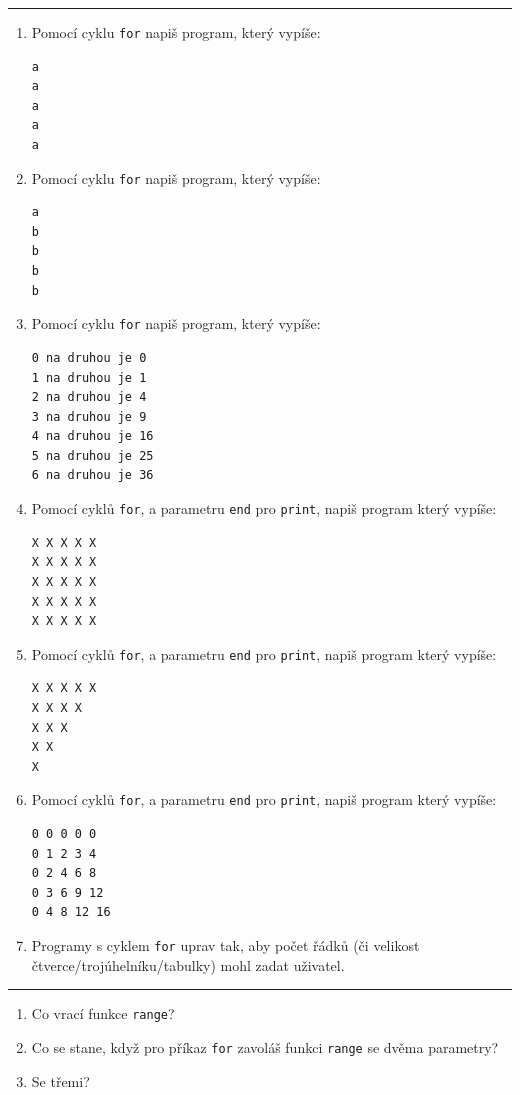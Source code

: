 \documentclass[a4paper,10pt]{article}
\begin{document}
\hrule

\begin{enumerate}[resume]
\item Pomocí cyklu \verb+for+ napiš program, který vypíše:
\begin{verbatim}
a
a
a
a
a
\end{verbatim}

\item Pomocí cyklu \verb+for+ napiš program, který vypíše:
\begin{verbatim}
a
b
b
b
b
\end{verbatim}

\item Pomocí cyklu \verb+for+ napiš program, který vypíše:
\begin{verbatim}
0 na druhou je 0
1 na druhou je 1
2 na druhou je 4
3 na druhou je 9
4 na druhou je 16
5 na druhou je 25
6 na druhou je 36
\end{verbatim}

\item Pomocí cyklů \verb+for+, a parametru \verb+end+ pro \verb+print+, napiš program který vypíše:
\begin{verbatim}
X X X X X
X X X X X
X X X X X
X X X X X
X X X X X
\end{verbatim}

\item Pomocí cyklů \verb+for+, a parametru \verb+end+ pro \verb+print+, napiš program který vypíše:
\begin{verbatim}
X X X X X
X X X X
X X X
X X
X
\end{verbatim}

\item Pomocí cyklů \verb+for+, a parametru \verb+end+ pro \verb+print+, napiš program který vypíše:
\begin{verbatim}
0 0 0 0 0
0 1 2 3 4
0 2 4 6 8
0 3 6 9 12
0 4 8 12 16
\end{verbatim}

\item Programy s cyklem \verb+for+ uprav tak, aby počet řádků
    (či velikost čtverce/trojúhelníku/tabulky)
    mohl zadat uživatel.

\end{enumerate}

\hrule

\begin{enumerate}[resume]
\item Co vrací funkce \verb+range+?

\item Co se stane, když pro příkaz \verb+for+
    zavoláš funkci \verb+range+ se dvěma parametry?

\item Se třemi?

\end{enumerate}
\end{document}
